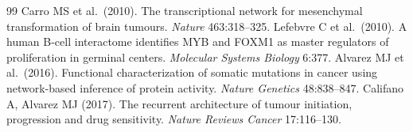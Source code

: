 \documentclass[11pt,a4paper]{article}
\theoremstyle{plain}
\theoremstyle{remark}
\begin{document}
\begin{thebibliography}{99}
 Carro MS et al.\ (2010). The transcriptional network for mesenchymal transformation of brain tumours. \emph{Nature} 463:318--325.
 Lefebvre C et al.\ (2010). A human B-cell interactome identifies MYB and FOXM1 as master regulators of proliferation in germinal centers. \emph{Molecular Systems Biology} 6:377.
 Alvarez MJ et al.\ (2016). Functional characterization of somatic mutations in cancer using network-based inference of protein activity. \emph{Nature Genetics} 48:838--847.
 Califano A, Alvarez MJ (2017). The recurrent architecture of tumour initiation, progression and drug sensitivity. \emph{Nature Reviews Cancer} 17:116--130.
\end{thebibliography}
\end{document}
